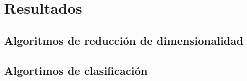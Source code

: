 \section{Resultados}

\subsection{Algoritmos de reducción de dimensionalidad}







\subsection{Algortimos de clasificación}






